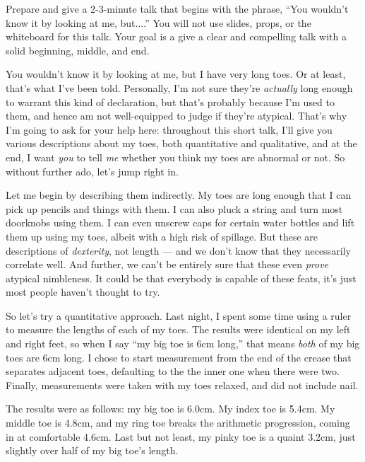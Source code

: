\documentclass{fkpset}
\begin{document}
\begin{problem}[Prompt]
  Prepare and give a 2-3-minute talk that begins with the phrase, ``You wouldn't
  know it by looking at me, but....'' You will not use slides, props, or the
  whiteboard for this talk. Your goal is a give a clear and compelling talk with
  a solid beginning, middle, and end.
\end{problem}
\begin{solution}[Outline.]\setlength{\parindent}{1.5em}
  You wouldn't know it by looking at me, but I have very long toes. Or at least,
  that's what I've been told. Personally, I'm not sure they're \emph{actually}
  long enough to warrant this kind of declaration, but that's probably because
  I'm used to them, and hence am not well-equipped to judge if they're atypical.
  That's why I'm going to ask for your help here: throughout this short talk,
  I'll give you various descriptions about my toes, both quantitative and
  qualitative, and at the end, I want \emph{you} to tell \emph{me} whether
  you think my toes are abnormal or not. So without further ado, let's jump
  right in.

  Let me begin by describing them indirectly. My toes are long enough that I can
  pick up pencils and things with them. I can also pluck a string and turn most
  doorknobs using them. I can even unscrew caps for certain water bottles and
  lift them up using my toes, albeit with a high risk of spillage. But these are
  descriptions of \emph{dexterity}, not length --- and we don't know that they
  necessarily correlate well. And further, we can't be entirely sure that these
  even \emph{prove} atypical nimbleness. It could be that everybody is capable
  of these feats, it's just most people haven't thought to try.

  So let's try a quantitative approach. Last night, I spent some time using a
  ruler to measure the lengths of each of my toes. The results were identical on
  my left and right feet, so when I say ``my big toe is 6\si{cm} long,'' that
  means \emph{both} of my big toes are 6\si{cm} long. I chose to start
  measurement from the end of the crease that separates adjacent toes,
  defaulting to the the inner one when there were two. Finally, measurements
  were taken with my toes relaxed, and did not include nail.

  The results were as follows: my big toe is 6.0\si{cm}. My index toe is
  5.4\si{cm}. My middle toe is 4.8\si{cm}, and my ring toe breaks the arithmetic
  progression, coming in at comfortable 4.6\si{cm}. Last but not least, my pinky
  toe is a quaint 3.2\si{cm}, just slightly over half of my big toe's length.


\end{solution}
\end{document}
